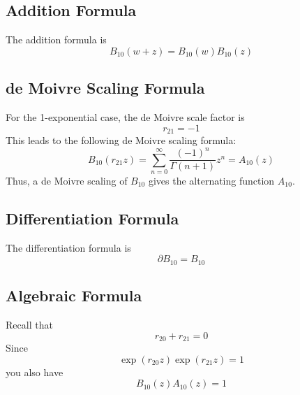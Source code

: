 \subsection{Addition Formula}
The addition formula is
\begin{equation}
    B_{10}(w + z) = B_{10}(w) B_{10}(z)
\end{equation}
\subsection{de Moivre Scaling Formula}
For the 1-exponential case, the de Moivre scale factor is
\begin{equation}
    r_{21} = -1
\end{equation}
This leads to the following de Moivre scaling formula:
\begin{equation}
    B_{10}(r_{21} z) = \sum_{n = 0}^{\infty} \frac{(-1)^{n}}{\Gamma(n + 1)} z^{n} = A_{10}(z)
\end{equation}
Thus, a de Moivre scaling of $B_{10}$ gives the alternating function $A_{10}$.
\subsection{Differentiation Formula}
The differentiation formula is
\begin{equation}
    \partial B_{10} = B_{10}
\end{equation}
\subsection{Algebraic Formula}
Recall that
\begin{equation}
    r_{20} + r_{21} = 0
\end{equation}
Since
\begin{equation}
    \exp\left(r_{20} z\right) \exp\left(r_{21} z\right) = 1
\end{equation}
you also have
\begin{equation}
    B_{10}(z) A_{10}(z) = 1
\end{equation}